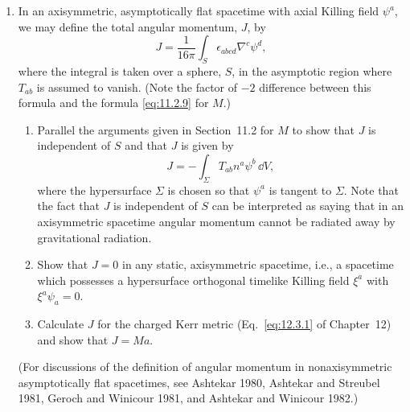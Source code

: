 \begin{enumerate}[label=\arabic*.,leftmargin=2em,itemsep=1.2ex]
\item
In an axisymmetric, asymptotically flat spacetime with axial Killing field \(\psi^a\),
we may define the total angular momentum, \(J\), by
\[
  J=\frac{1}{16\pi}\int_S\epsilon_{abcd}\nabla^c\psi^d,
\]
where the integral is taken over a sphere, \(S\), in the asymptotic region where
\(T_{ab}\) is assumed to vanish. (Note the factor of \(-2\) difference between this
formula and the formula \eqref{eq:11.2.9} for \(M\).)
\begin{enumerate}[label=\alph*),leftmargin=2em,itemsep=.45ex]
\item Parallel the arguments given in Section~11.2 for \(M\) to show that \(J\) is
independent of \(S\) and that \(J\) is given by
\[
  J=-\int_\Sigma T_{ab}n^a\psi^b\,\dd V,
\]
where the hypersurface \(\Sigma\) is chosen so that \(\psi^a\) is tangent to
\(\Sigma\). Note that the fact that \(J\) is independent of \(S\) can be interpreted as
saying that in an axisymmetric spacetime angular momentum cannot be radiated away
by gravitational radiation.
\item Show that \(J=0\) in any static, axisymmetric spacetime, i.e., a spacetime
which possesses a hypersurface orthogonal timelike Killing field \(\xi^a\) with
\(\xi^a\psi_a=0\).
\item Calculate \(J\) for the charged Kerr metric (Eq.~\eqref{eq:12.3.1} of
Chapter~12) and show that \(J=Ma\).
\end{enumerate}
\noindent
(For discussions of the definition of angular momentum in nonaxisymmetric
asymptotically flat spacetimes, see Ashtekar 1980, Ashtekar and Streubel 1981,
Geroch and Winicour 1981, and Ashtekar and Winicour 1982.)
\end{enumerate}
